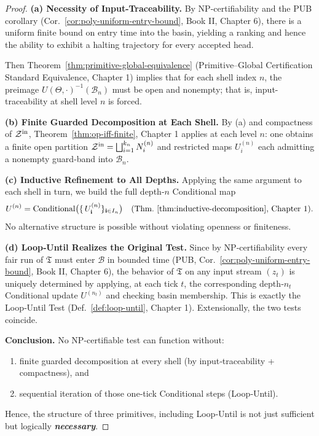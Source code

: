 \documentclass[12pt]{article}
\theoremstyle{definition}
\theoremstyle{plain}
\begin{document}
\begin{proof}
\textbf{(a) Necessity of Input-Traceability.}  
By NP-certifiability and the PUB corollary (Cor.~\ref{cor:poly-uniform-entry-bound}, Book II, Chapter 6), there is a uniform finite bound on entry time into the basin, yielding a ranking and hence the ability to exhibit a halting trajectory for every accepted head.  

Then Theorem~\ref{thm:primitive-global-equivalence} (Primitive–Global Certification Standard Equivalence, Chapter 1) implies that for each shell index \(n\), the preimage \(U(\Theta,\cdot)^{-1}(\mathcal B_n)\) must be open and nonempty; that is, input-traceability at shell level \(n\) is forced.

\medskip\noindent
\textbf{(b) Finite Guarded Decomposition at Each Shell.}  
By (a) and compactness of \(\mathcal Z^{\rm in}\), Theorem~\ref{thm:op-iff-finite}, Chapter 1 applies at each level \(n\): one obtains a finite open partition 
\(\mathcal Z^{\rm in}=\bigsqcup_{i=1}^{k_n} N^{(n)}_i\)
and restricted maps \(U^{(n)}_i\) each admitting a nonempty guard‑band into \(\mathcal B_n\).

\medskip\noindent
\textbf{(c) Inductive Refinement to All Depths.}  
Applying the same argument to each shell in turn, we build the full depth‑\(n\) Conditional map
\[
  U^{(n)} = \mathrm{Conditional}\bigl(\{\,U^{(n)}_{\mathbf i}\}_{\mathbf i\in I_n}\bigr)
  \quad (\text{Thm.~\ref{thm:inductive-decomposition}, Chapter 1}).
\]
No alternative structure is possible without violating openness or finiteness.

\medskip\noindent
\textbf{(d) Loop‑Until Realizes the Original Test.}  
Since by NP‑certifiability every fair run of \(\mathfrak T\) must enter \(\mathcal B\) in bounded time (PUB, Cor.~\ref{cor:poly-uniform-entry-bound}, Book II, Chapter 6), the behavior of \(\mathfrak T\) on any input stream \((z_t)\) is uniquely determined by applying, at each tick \(t\), the corresponding depth‑\(n_t\) Conditional update \(U^{(n_t)}\) and checking basin membership.  This is exactly the Loop‑Until Test (Def.~\ref{def:loop-until}, Chapter 1).  Extensionally, the two tests coincide.

\medskip\noindent
\textbf{Conclusion.}  
No NP‑certifiable test can function without:
\begin{enumerate}
    \item finite guarded decomposition at every shell (by input‑traceability + compactness), and
    \item sequential iteration of those one‑tick Conditional steps (Loop‑Until).
\end{enumerate}
Hence, the structure of three primitives, including Loop‑Until is not just sufficient but logically \textbf{\textit{necessary}}.
\end{proof}
\end{document}

